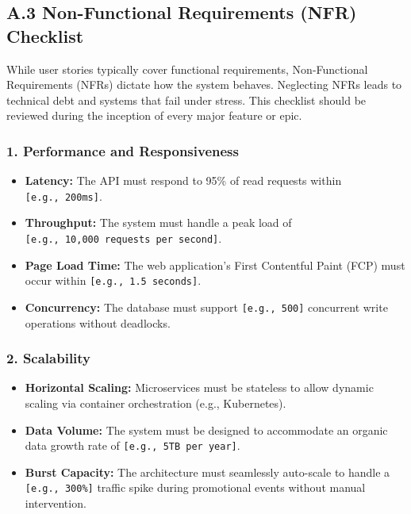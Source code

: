 \bigskip

\subsection{A.3 Non-Functional Requirements (NFR)
Checklist}\label{a.3-non-functional-requirements-nfr-checklist}

While user stories typically cover functional requirements,
Non-Functional Requirements (NFRs) dictate how the system behaves.
Neglecting NFRs leads to technical debt and systems that fail under
stress. This checklist should be reviewed during the inception of every
major feature or epic.

\subsubsection{1. Performance and
Responsiveness}\label{performance-and-responsiveness}

\begin{itemize}
\tightlist
\item
  \textbf{Latency:} The API must respond to 95\% of read requests within
  \texttt{{[}e.g.,\ 200ms{]}}.
\item
  \textbf{Throughput:} The system must handle a peak load of
  \texttt{{[}e.g.,\ 10,000\ requests\ per\ second{]}}.
\item
  \textbf{Page Load Time:} The web application's First Contentful Paint
  (FCP) must occur within \texttt{{[}e.g.,\ 1.5\ seconds{]}}.
\item
  \textbf{Concurrency:} The database must support
  \texttt{{[}e.g.,\ 500{]}} concurrent write operations without
  deadlocks.
\end{itemize}

\subsubsection{2. Scalability}\label{scalability}

\begin{itemize}
\tightlist
\item
  \textbf{Horizontal Scaling:} Microservices must be stateless to allow
  dynamic scaling via container orchestration (e.g., Kubernetes).
\item
  \textbf{Data Volume:} The system must be designed to accommodate an
  organic data growth rate of \texttt{{[}e.g.,\ 5TB\ per\ year{]}}.
\item
  \textbf{Burst Capacity:} The architecture must seamlessly auto-scale
  to handle a \texttt{{[}e.g.,\ 300\%{]}} traffic spike during
  promotional events without manual intervention.
\end{itemize}

